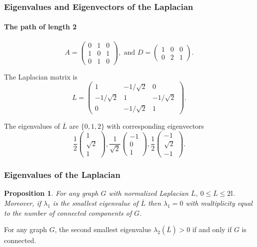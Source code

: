 \documentclass[aspectratio=43,leqno]{beamer}
\newtheorem{proposition}[theorem]{Proposition}
\begin{document}
\begin{frame}
    \frametitle{Eigenvalues and Eigenvectors of the Laplacian}
    \framesubtitle{The path of length 2}

\begin{displaymath}
  A = \begin{pmatrix} 0 & 1 & 0 \\ 1 & 0 & 1 \\ 0 & 1 & 0 \end{pmatrix},
  \text{ and }
  D = \begin{pmatrix} 1 & 0 & 0 \\ 0 & 2 & 1 \end{pmatrix}.
\end{displaymath}
\pause

The Laplacian matrix is 
\begin{displaymath}
L = \begin{pmatrix} 1 & -1/\sqrt{2} & 0 \\ -1/\sqrt{2} & 1 & -1/\sqrt{2} \\ 0 & -1/\sqrt{2} & 1 \end{pmatrix}.
\end{displaymath}
\pause

The eigenvalues of $\overline{L}$ are $\{ 0, 1, 2 \}$ with corresponding eigenvectors 
\begin{displaymath}
  \frac{1}{2} \begin{pmatrix} 1 \\ \sqrt{2} \\ 1 \end{pmatrix}, \frac{1}{\sqrt{2}} \begin{pmatrix} -1 \\ 0 \\ 1 \end{pmatrix}, \frac{1}{2} \begin{pmatrix} -1 \\ \sqrt{2} \\ -1 \end{pmatrix}.
\end{displaymath}

\end{frame}

\begin{frame}
    \frametitle{Eigenvalues of the Laplacian}

\begin{proposition}
For any graph $G$ with normalized Laplacian $\overline{L}$, $0 \leq \overline{L} \leq 2\mathbb{I}$. Moreover, if $\lambda_1$ is the smallest eigenvalue of $\overline{L}$ then $\lambda_1 = 0$ with multiplicity equal to the number of connected components of $G$.
\end{proposition}
\pause

\begin{corollary}
For any graph $G$, the second smallest eigenvalue $\lambda_2(\overline{L})>0$ if and only if $G$ is connected.
\end{corollary}
\end{frame}
\end{document}
